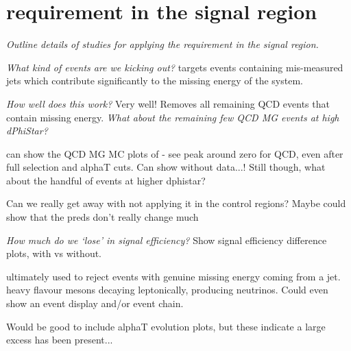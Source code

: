 
\chapter{\dphistar requirement in the signal region}

\emph{Outline details of studies for applying the \dphistar requirement in the
signal region.}

\emph{What kind of events are we kicking out?} targets events containing
mis-measured jets which contribute significantly to the missing energy of the
system.

\emph{How well does this work?} Very well! Removes all remaining QCD events that
contain missing energy. \emph{What about the remaining few QCD MG events at high
dPhiStar?}

can show the QCD MG MC plots of \dphistar - see peak around zero for QCD, even
after full selection and alphaT cuts. Can show without data...! Still though,
what about the handful of events at higher dphistar?

Can we really get away with not applying it in the control regions?
    Maybe could show that the preds don't really change much

\emph{How much do we `lose' in signal efficiency?} Show signal efficiency
difference plots, with vs without.

ultimately used to reject events with genuine missing energy coming from a jet.
heavy flavour mesons decaying leptonically, producing neutrinos. Could even show
an event display and/or event chain.

Would be good to include alphaT evolution plots, but these indicate a large
excess has been present...